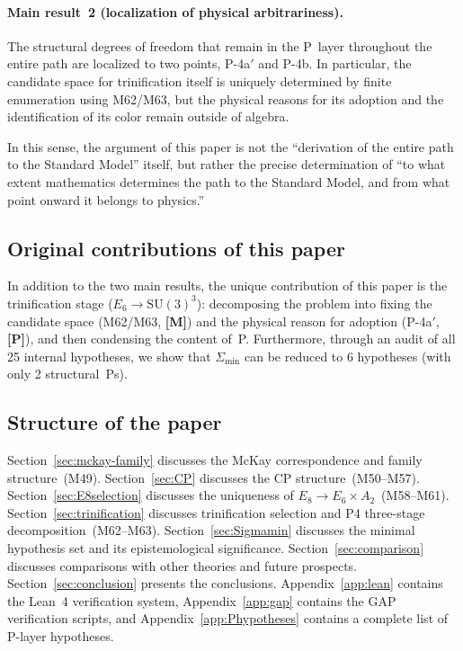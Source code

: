 \documentclass[sn-mathphys-num,Numbered]{sn-jnl}
\theoremstyle{thmstyleone}
\theoremstyle{thmstylethree}
\newcommand{\Amin}{\Sigma_{\min}}
\newcommand{\SU}{\mathrm{SU}}
\newcommand{\layerM}{\textbf{[M]}}
\newcommand{\layerP}{\textbf{[P]}}
\begin{document}
\paragraph{Main result~2 (localization of physical arbitrariness).}
The structural degrees of freedom that remain in the P~layer throughout the
entire path are localized to two points, P-4a$'$ and P-4b.  In particular,
the candidate space for trinification itself is uniquely determined by finite
enumeration using M62/M63, but the physical reasons for its adoption and the
identification of its color remain outside of algebra.

In this sense, the argument of this paper is not the ``derivation of the
entire path to the Standard Model'' itself, but rather the precise
determination of ``to what extent mathematics determines the path to the
Standard Model, and from what point onward it belongs to physics.''


\subsection{Original contributions of this paper}\label{sec:contributions}

In addition to the two main results, the unique contribution of this paper is
the trinification stage ($E_6 \to \SU(3)^3$): decomposing the problem into
fixing the candidate space (M62/M63, \layerM) and the physical reason for
adoption (P-4a$'$, \layerP), and then condensing the content of~P.
Furthermore, through an audit of all 25 internal hypotheses, we show that
$\Amin$ can be reduced to 6 hypotheses (with only 2 structural~Ps).


\subsection{Structure of the paper}\label{sec:structure}

Section~\ref{sec:mckay-family} discusses the McKay correspondence and family
structure~(M49).  Section~\ref{sec:CP} discusses the CP
structure~(M50--M57).  Section~\ref{sec:E8selection} discusses the uniqueness
of $E_8 \to E_6 \times A_2$~(M58--M61).
Section~\ref{sec:trinification} discusses trinification selection and P4
three-stage decomposition~(M62--M63).
Section~\ref{sec:Sigmamin} discusses the minimal hypothesis set and its
epistemological significance.  Section~\ref{sec:comparison} discusses
comparisons with other theories and future prospects.
Section~\ref{sec:conclusion} presents the conclusions.  Appendix~\ref{app:lean}
contains the Lean~4 verification system, Appendix~\ref{app:gap} contains the
GAP verification scripts, and Appendix~\ref{app:Phypotheses} contains a
complete list of P-layer hypotheses.
\end{document}
